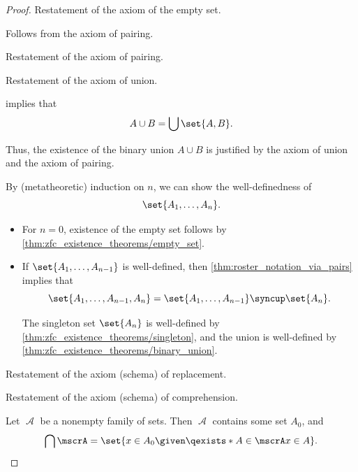 \begin{proof}
   Restatement of the axiom of the empty set.

   Follows from the axiom of pairing.

   Restatement of the axiom of pairing.

   Restatement of the axiom of union.

    implies that
  \begin{equation*}
    A \cup B = \bigcup \set{ A, B }.
  \end{equation*}

  Thus, the existence of the binary union \( A \cup B \) is justified by the axiom of union and the axiom of pairing.

   By (metatheoretic) induction on \( n \), we can show the well-definedness of
  \begin{equation*}
    \set{ A_1, \ldots, A_n }.
  \end{equation*}

  \begin{itemize}
    \item For \( n = 0 \), existence of the empty set follows by \cref{thm:zfc_existence_theorems/empty_set}.
    \item If \( \set{ A_1, \ldots, A_{n - 1} } \) is well-defined, then \cref{thm:roster_notation_via_pairs} implies that
    \begin{equation*}
      \set{ A_1, \ldots, A_{n-1}, A_n } = \set{ A_1, \ldots, A_{n-1} } \syncup \set{ A_n }.
    \end{equation*}

    The singleton set \( \set{ A_n } \) is well-defined by \cref{thm:zfc_existence_theorems/singleton}, and the union is well-defined by \cref{thm:zfc_existence_theorems/binary_union}.
  \end{itemize}

   Restatement of the axiom (schema) of replacement.

   Restatement of the axiom (schema) of comprehension.

   Let \( \mscrA \) be a nonempty family of sets. Then \( \mscrA \) contains some set \( A_0 \), and
  \begin{equation*}
    \bigcap \mscrA = \set{ x \in A_0 \given \qexists* {A \in \mscrA} x \in A }.
  \end{equation*}


\end{proof}
